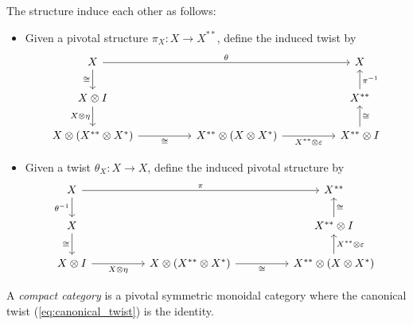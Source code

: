 \documentclass{article}
\begin{document}
The structure induce each other as follows:
\begin{itemize}
  \item Given a pivotal structure $\pi_X : X\to X^{**}$, define the induced twist by
    \begin{equation}\label{eq:canonical_twist}
      \begin{tikzcd}
        X &&&& X \\
        {X\otimes I} &&&& {X^{**}} \\
        {X\otimes (X^{**}\otimes X^*)} && {X^{**}\otimes (X\otimes X^*)} && {X^{**}\otimes I}
        \arrow["\theta", from=1-1, to=1-5]
        \arrow["{\pi^{-1}}"', from=2-5, to=1-5]
        \arrow["{X\otimes \eta}"', from=2-1, to=3-1]
        \arrow["\cong"', from=1-1, to=2-1]
        \arrow["\cong"', from=3-5, to=2-5]
        \arrow["\cong"', from=3-1, to=3-3]
        \arrow["{X^{**}\otimes\varepsilon}"', from=3-3, to=3-5]
      \end{tikzcd}
    \end{equation}
  \item Given a twist $\theta_X : X\to X$, define the induced pivotal structure by
    \begin{equation}
      \begin{tikzcd}
        X &&&& {X^{**}} \\
        X &&&& {X^{**}\otimes I} \\
        {X\otimes I} && {X\otimes(X^{**}\otimes X^*)} && {X^{**}\otimes(X\otimes X^*)}
        \arrow["\pi", from=1-1, to=1-5]
        \arrow["{\theta^{-1}}"', from=1-1, to=2-1]
        \arrow["\cong"', from=2-5, to=1-5]
        \arrow["{X^{**}\otimes\varepsilon}"', from=3-5, to=2-5]
        \arrow["\cong"', from=3-3, to=3-5]
        \arrow["{X\otimes \eta}"', from=3-1, to=3-3]
        \arrow["\cong"', from=2-1, to=3-1]
      \end{tikzcd}
    \end{equation}
\end{itemize}

\begin{definition}
  A \emph{compact category} is a pivotal symmetric monoidal category where the
  canonical twist (\ref{eq:canonical_twist}) is the identity.
\end{definition}
\end{document}

